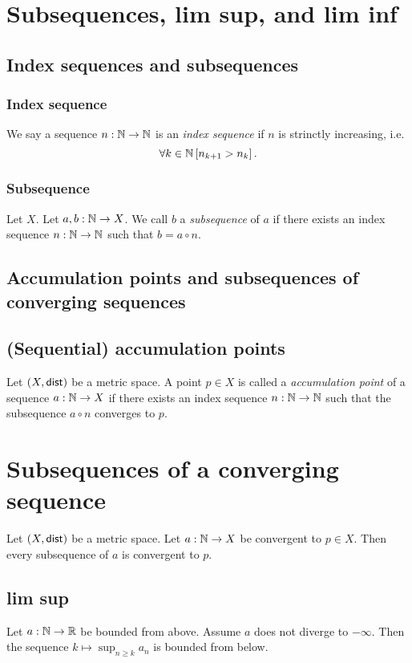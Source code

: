 \section{Subsequences, lim sup, and lim inf}


\subsection{Index sequences and subsequences}
\subsubsection*{Index sequence}
\udef We say a sequence $n : \mathbb{N} \to \mathbb{N}$ is an \emph{index sequence}
if $n$ is strinctly increasing, i.e.
\[
    \forall k \in \mathbb{N} \left[ n_{k+1} > n_k \right].
\]

\subsubsection*{Subsequence}
\udef Let $X$. Let $a,b : \mathbb{N} \to X$. We call $b$ a \emph{subsequence} of $a$
if there exists an index sequence $n : \mathbb{N} \to \mathbb{N}$ such that $b = a \circ n$.

\subsection{Accumulation points and subsequences of converging sequences}
\subsection{(Sequential) accumulation points}
\udef Let $(X, \mathsf{dist})$ be a metric space. A point $p \in X$ is called
a \emph{accumulation point} of a sequence $a : \mathbb{N} \to X$ if there exists
an index sequence $n : \mathbb{N} \to \mathbb{N}$ such that the subsequence $a \circ n$
converges to $p$. 

\section{Subsequences of a converging sequence}
\uprop Let $(X, \mathsf{dist})$ be a metric space. Let $a : \mathbb{N} \to X$ be convergent to
$p \in X$. Then every subsequence of $a$ is convergent to $p$.


\subsection{lim sup}
\ulem Let $a : \mathbb{N} \to \mathbb{R}$ be bounded from above. Assume $a$ does not diverge
to $-\infty$. Then the sequence $k \mapsto \sup_{n \geq k} a_n$ is bounded
from below.

